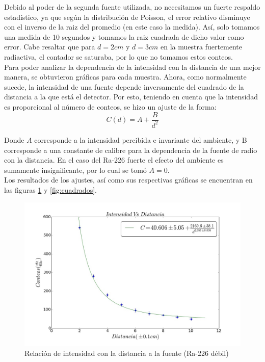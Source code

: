 \documentclass[%
 reprint,
 amsmath,amssymb,
 aps,
]{revtex4-1}
\begin{document}
Debido al poder de la segunda fuente utilizada, no necesitamos un fuerte respaldo estadístico, ya que según la distribución de Poisson, el error relativo disminuye con el inverso de la raiz del promedio (en este caso la medida). Así, solo tomamos una medida de 10 segundos y tomamos la raiz cuadrada de dicho valor como error. Cabe resaltar que para $d= 2cm$ y $d = 3cm$ en la muestra fuertemente radiactiva, el contador se saturaba, por lo que no tomamos estos conteos.\\

Para poder analizar la dependencia de la intensidad con la distancia de una mejor manera, se obtuvieron gráficas para cada muestra. Ahora, como normalmente sucede, la intensidad de una fuente depende inversamente del cuadrado de la distancia a la que está el detector. Por esto, teniendo en cuenta que la intensidad es proporcional al número de conteos, se hizo un ajuste de la forma:\\

\begin{equation}
 	C(d) = A + \frac{B}{d^2}
\end{equation}

Donde $A$ corresponde a la intensidad percibida e invariante del ambiente, y B corresponde a una constante de calibre  para la dependencia de la fuente de radio con la distancia. En el caso del Ra-226 fuerte el efecto del ambiente es sumamente insignificante, por lo cual se tomó $A = 0$.\\

Los resultados de los ajustes, así como sus respectivas gráficas se encuentran en las figuras \ref{fig:distancia} y \ref{fig:cuadrados}.\\

\begin{figure}[h!]
\centering
\includegraphics[width=1.1\linewidth]{distancia.jpg}
\caption{Relación de intensidad con la distancia a la fuente (Ra-226 débil)}
\label{fig:distancia}
\end{figure}
\end{document}
